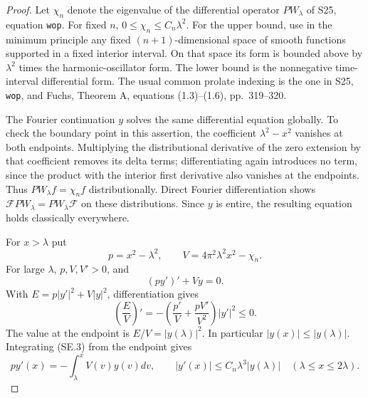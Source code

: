 \begin{proof}
Let $\chi_n$ denote the eigenvalue of the differential
operator $PW_\lambda$ of S25, equation \texttt{wop}.
For fixed $n$,
$0\leq\chi_n\leq C_n\lambda^2$.
For the upper bound, use in the minimum principle
any fixed $(n+1)$-dimensional space of smooth functions
supported in a fixed interior interval.
On that space its form is bounded above by $\lambda^2$
times the harmonic-oscillator form.  The lower bound
is the nonnegative time-interval differential form.
The usual common prolate indexing is the one in
S25, \texttt{wop}, and Fuchs, Theorem A, equations
(1.3)--(1.6), pp.~319--320.

The Fourier continuation $y$ solves the same differential
equation globally.  To check the boundary point in this
assertion, the coefficient $\lambda^2-x^2$ vanishes at
both endpoints.  Multiplying the distributional derivative
of the zero extension by that coefficient removes its
delta terms; differentiating again introduces no term,
since the product with the interior first derivative
also vanishes at the endpoints.  Thus
$PW_\lambda f=\chi_nf$ distributionally.
Direct Fourier differentiation shows
$\mathcal F PW_\lambda=PW_\lambda\mathcal F$ on
these distributions.  Since $y$ is entire, the resulting
equation holds classically everywhere.

For $x>\lambda$ put
\[
 p=x^2-\lambda^2,\qquad V=4\pi^2\lambda^2x^2-\chi_n.
\]
For large $\lambda$, $p,V,V'>0$, and
\[
                (py')'+Vy=0.                       \tag{SE.3}
\]
With $E=p|y'|^2+V|y|^2$, differentiation gives
\[
 \left(\frac EV\right)'
       =-\left(\frac{p'}V+\frac{pV'}{V^2}\right)|y'|^2
                         \leq0.                    \tag{SE.4}
\]
The value at the endpoint is $E/V=|y(\lambda)|^2$.
In particular $|y(x)|\leq|y(\lambda)|$.
Integrating (SE.3) from the endpoint gives
\[
 py'(x)=-\int_\lambda^xV(v)y(v)dv,
 \qquad |y'(x)|\leq C_n\lambda^3|y(\lambda)|
                         \quad(\lambda\leq x\leq2\lambda).
                                                        \tag{SE.5}
\]


\end{proof}
